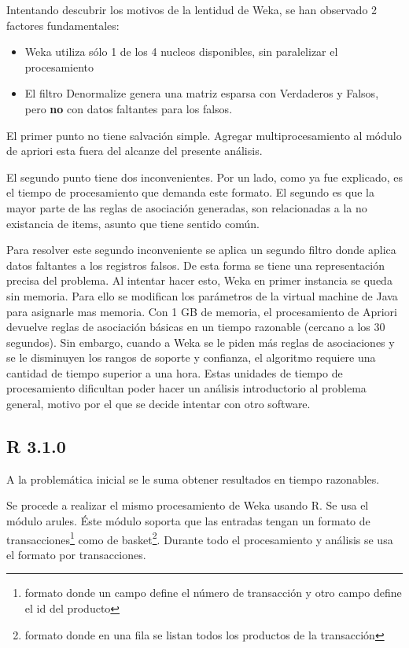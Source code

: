 \documentclass[journal]{IEEEtran}
\begin{document}
Intentando descubrir los motivos de la lentidud de Weka, se han observado 2 factores fundamentales:
\begin{itemize}
	\item Weka utiliza sólo 1 de los 4 nucleos disponibles, sin paralelizar el procesamiento
	\item El filtro Denormalize genera una matriz esparsa con Verdaderos y Falsos, pero \textbf{no} con
	datos faltantes para los falsos. 
\end{itemize}

El primer punto no tiene salvación simple. Agregar multiprocesamiento al módulo de apriori esta
fuera del alcanze del presente análisis.

El segundo punto tiene dos inconvenientes. Por un lado, como ya fue explicado, es el tiempo de 
procesamiento que demanda este formato. El segundo es que la mayor parte de las reglas de asociación
generadas, son relacionadas a la no existancia de items, asunto que tiene sentido común.

Para resolver este segundo inconveniente se aplica un segundo filtro donde aplica datos faltantes 
a los registros falsos. De esta forma se tiene una representación precisa del problema. Al intentar 
hacer esto, Weka en primer instancia se queda sin memoria. Para ello se modifican los parámetros de
la virtual machine de Java para asignarle mas memoria. Con 1 GB de memoria, el procesamiento de
Apriori devuelve reglas de asociación básicas en un tiempo razonable (cercano a los 30 segundos). 
Sin embargo, cuando a Weka se le piden más reglas de asociaciones y se le disminuyen los rangos de 
soporte y confianza, el algoritmo requiere una cantidad de tiempo superior a una hora. Estas unidades
de tiempo de procesamiento dificultan poder hacer un análisis introductorio al problema general,
motivo por el que se decide intentar con otro software.


\subsection{R 3.1.0}
A la problemática inicial se le suma obtener resultados en tiempo razonables. 

Se procede a realizar el mismo procesamiento de Weka usando R. Se usa el módulo arules. Éste 
módulo soporta que las entradas tengan un formato de transacciones\footnote{formato donde un 
campo define el número de transacción y otro campo define el id del producto}
como de basket\footnote{formato donde en una fila se listan todos los productos de la transacción}.
Durante todo el procesamiento y análisis se usa el formato por transacciones.
\end{document}
